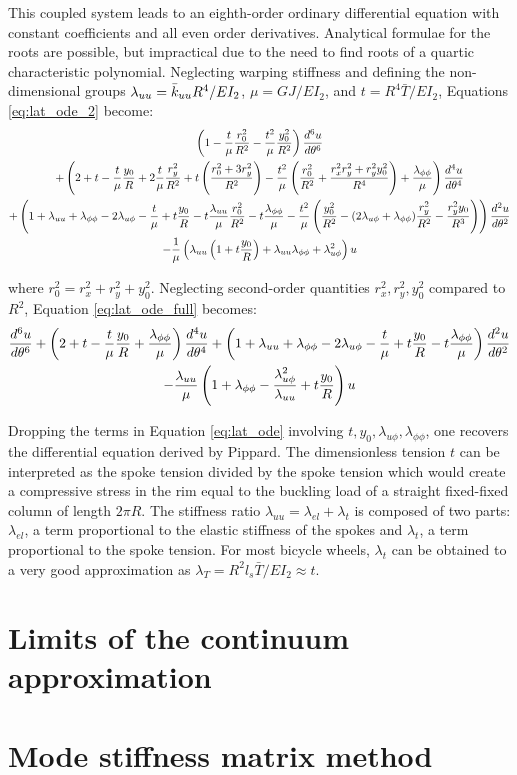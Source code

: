 \documentclass[\rootdir/thesis.tex]{subfiles}
\begin{document}
This coupled system leads to an eighth-order ordinary differential equation with constant coefficients and all even order derivatives. Analytical formulae for the roots are possible, but impractical due to the need to find roots of a quartic characteristic polynomial. Neglecting warping stiffness and defining the non-dimensional groups $\lambda_{uu}=\bar{k}_{uu} R^4/EI_2$, $\mu=GJ/EI_2$, and $t=R^4\bar{T}/EI_2$, Equations \eqref{eq:lat_ode_2} become:
\begin{multline}
\label{eq:lat_ode_full}
  \left(1-\frac{t}{\mu}\frac{r_0^2}{R^2} - \frac{t^2}{\mu}\frac{y_0^2}{R^2}\right)\frac{d^6u}{d\theta^6}\\
  +\left(2+t-\frac{t}{\mu}\frac{y_0}{R} + 2\frac{t}{\mu}\frac{r_y^2}{R^2}
         +t\left(\frac{r_0^2 + 3r_y^2}{R^2}\right)
         -\frac{t^2}{\mu}\left(\frac{r_0^2}{R^2}+\frac{r_x^2r_y^2+r_y^2y_0^2}{R^4}\right)
         +\frac{\lambda_{\phi\phi}}{\mu}\right) \frac{d^4u}{d\theta^4}\\
  +\left(1+\lambda_{uu}+\lambda_{\phi\phi}-2\lambda_{u\phi}
         -\frac{t}{\mu}+t\frac{y_0}{R}-t\frac{\lambda_{uu}}{\mu}\frac{r_0^2}{R^2}
         -t\frac{\lambda_{\phi\phi}}{\mu}
         -\frac{t^2}{\mu}\left(\frac{y_0^2}{R^2}-(2\lambda_{u\phi}+\lambda_{\phi\phi})\frac{r_y^2}{R^2} - \frac{r_y^2y_0}{R^3}\right)
         \right)\frac{d^2u}{d\theta^2}\\
  -\frac{1}{\mu}\left(\lambda_{uu}\left(1+t\frac{y_0}{R}\right)
                      +\lambda_{uu}\lambda_{\phi\phi} + \lambda_{u\phi}^2\right)u
\end{multline}

where $r_0^2=r_x^2+r_y^2+y_0^2$. Neglecting second-order quantities $r_x^2,r_y^2,y_0^2$ compared to $R^2$, Equation \eqref{eq:lat_ode_full} becomes:
\begin{multline}
\label{eq:lat_ode}
  \frac{d^6u}{d\theta^6}
  +\left(2+t-\frac{t}{\mu}\frac{y_0}{R}
         +\frac{\lambda_{\phi\phi}}{\mu}\right) \frac{d^4u}{d\theta^4}
  +\left(1+\lambda_{uu}+\lambda_{\phi\phi}-2\lambda_{u\phi}
         -\frac{t}{\mu}+t\frac{y_0}{R}
         -t\frac{\lambda_{\phi\phi}}{\mu}\right)\frac{d^2u}{d\theta^2}\\
  -\frac{\lambda_{uu}}{\mu}\left(1+\lambda_{\phi\phi}
                                 -\frac{\lambda_{u\phi}^2}{\lambda_{uu}}
                                 +t\frac{y_0}{R}\right)u
\end{multline}

Dropping the terms in Equation \eqref{eq:lat_ode} involving $t, y_0, \lambda_{u\phi}, \lambda_{\phi\phi}$, one recovers the differential equation derived by Pippard\cite{Pippard}. The dimensionless tension $t$ can be interpreted as the spoke tension divided by the spoke tension which would create a compressive stress in the rim equal to the buckling load of a straight fixed-fixed column of length $2\pi R$. The stiffness ratio $\lambda_{uu}=\lambda_{el}+\lambda_t$ is composed of two parts: $\lambda_{el}$, a term proportional to the elastic stiffness of the spokes and $\lambda_t$, a term proportional to the spoke tension. For most bicycle wheels, $\lambda_t$ can be obtained to a very good approximation as $\lambda_T = R^2l_s\bar{T}/EI_2 \approx t$.

\section{Limits of the continuum approximation}


\section{Mode stiffness matrix method}
\end{document}
